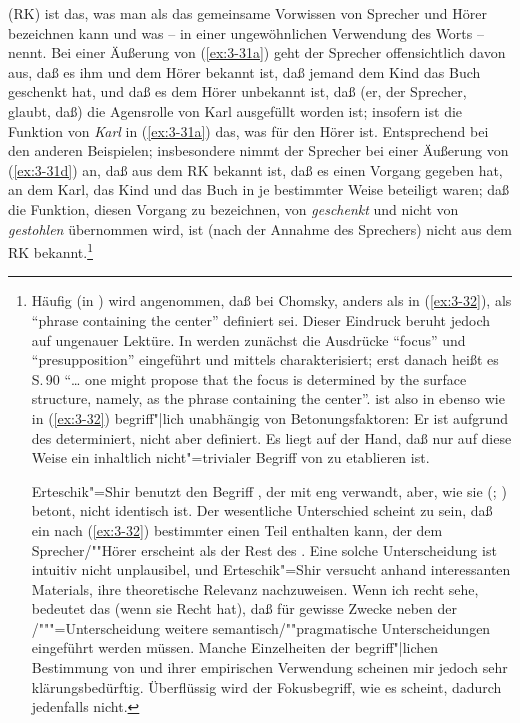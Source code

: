 \documentclass[output=paper]{langsci/langscibook}
\begin{document}
\addlines[2]
 (RK) ist das, was man als das gemeinsame
Vorwissen von Sprecher und Hörer bezeichnen kann und was
\citet{Chomsky76a} -- in einer ungewöhnlichen Verwendung des Worts --
 nennt. Bei einer Äußerung von (\ref{ex:3-31a}) geht der
Sprecher offensichtlich davon aus, daß es ihm und dem Hörer bekannt
ist, daß jemand dem Kind das Buch geschenkt hat, und daß es dem Hörer
unbekannt ist, daß (er, der Sprecher, glaubt, daß) die Agensrolle von
Karl ausgefüllt worden ist; insofern ist die Funktion von
\textit{Karl} in (\ref{ex:3-31a}) das, was für den Hörer 
ist. Entsprechend bei den anderen Beispielen; insbesondere nimmt der
Sprecher bei einer Äußerung von (\ref{ex:3-31d}) an, daß aus dem RK bekannt ist,
daß es einen Vorgang gegeben hat, an dem Karl, das Kind und das Buch
in je bestimmter Weise beteiligt waren; daß die Funktion, diesen
Vorgang zu bezeichnen, von \textit{geschenkt} und nicht \zb von
\textit{gestohlen} übernommen wird, ist (nach der Annahme des
Sprechers) nicht aus dem RK bekannt.\footnote{\label{fn:3-9}%
    Häufig (\zb in \citealt[43]{Erteschick79c}) wird angenommen, daß bei Chomsky, anders als in (\ref{ex:3-32}),  als "`phrase containing the  center"' definiert sei. Dieser Eindruck beruht jedoch auf ungenauer Lektüre. In \citet[89]{Chomsky76a} werden zunächst die
  Ausdrücke "`focus"' und "`presupposition"' eingeführt und mittels
   charakterisiert; erst danach heißt
  es S.\,90 "`\ldots{}{} one might propose that the focus is determined by the
  surface structure, namely, as the phrase containing the 
  center"'.  ist also in \citet{Chomsky76a} ebenso wie in
  (\ref{ex:3-32}) begriff"|lich unabhängig von Betonungsfaktoren: Er ist aufgrund des
   determiniert, nicht aber definiert. Es
  liegt auf der Hand, daß nur auf diese Weise ein inhaltlich nicht"=trivialer Begriff von  zu etablieren ist.

  Erteschik"=Shir benutzt den Begriff , der mit  eng verwandt, aber, wie sie (\citealt[443ff]{Erteschick79a}; \citealt[43ff]{Erteschick79c}) betont, nicht
  identisch ist. Der wesentliche Unterschied scheint zu sein, daß ein nach (\ref{ex:3-32}) bestimmter  einen Teil enthalten kann, der dem Sprecher/""Hörer  erscheint als der Rest des . Eine solche Unterscheidung ist intuitiv nicht unplausibel, und Erteschik"=Shir versucht anhand interessanten Materials, ihre theoretische Relevanz nachzuweisen. Wenn ich recht sehe, bedeutet das (wenn sie Recht hat), daß für gewisse Zwecke neben der /"""=Unterscheidung weitere semantisch/""pragmatische Unterscheidungen eingeführt werden müssen. Manche Einzelheiten der begriff"|lichen Bestimmung von  und ihrer empirischen
  Verwendung scheinen mir jedoch sehr klärungsbedürftig. Überflüssig wird der Fokusbegriff, wie es
  scheint, dadurch jedenfalls nicht.%
}
\end{document}
